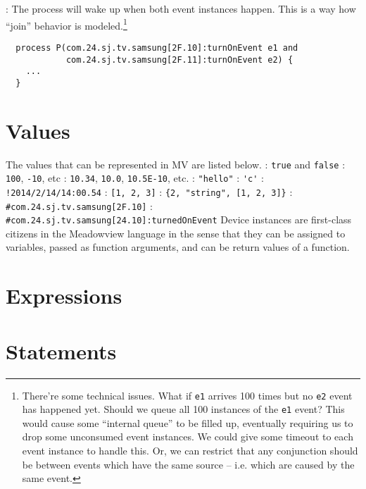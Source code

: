 \documentclass{note}
\begin{document}
\w {}: The process will wake up when both event
instances happen. This is a way how ``join'' behavior is
modeled.\footnote{There're some technical issues. What if {\tt{}e1} arrives
  100 times but no {\tt{}e2} event has happened yet. Should we queue all
  100 instances of the {\tt e1} event? This would cause some ``internal
  queue'' to be filled up, eventually requiring us to drop some unconsumed
  event instances.  We could give some timeout to each event instance to
  handle this. 
  Or, we can restrict that any conjunction should be between
  events which have the same source -- i.e. which are caused by the same
  event. } 
  \begin{verbatim}
  process P(com.24.sj.tv.samsung[2F.10]:turnOnEvent e1 and
            com.24.sj.tv.samsung[2F.11]:turnOnEvent e2) {
    ...
  }
  \end{verbatim}
\eit

\section{Values}
The values that can be represented in MV are listed below.
\bit
\w {}: \verb+true+ and \verb+false+
\w {}: \verb+100+, \verb+-10+, etc
\w {}: \verb+10.34+, \verb+10.0+, \verb+10.5E-10+, etc.
\w {}: \verb+"hello"+
\w {}: \verb+'c'+
\w {}: \verb+!2014/2/14/14:00.54+
\w {}: \verb+[1, 2, 3]+
\w {}: \verb+{2, "string", [1, 2, 3]}+
\w {}: \verb+#com.24.sj.tv.samsung[2F.10]+
\w {}: \verb+#com.24.sj.tv.samsung[24.10]:turnedOnEvent+
 Device instances are first-class citizens in the Meadowview language in the
  sense that they can be assigned to variables, passed as function arguments,
  and can be return values of a function.
\eit

\section{Expressions}

\section{Statements}
\end{document}
